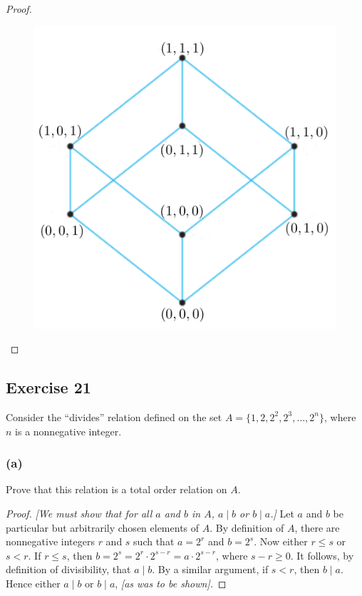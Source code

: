 \documentclass[14pt]{extarticle}
\begin{document}
\begin{proof}
\begin{figure}[ht!]
\centering
\includegraphics[scale=0.4]{../images/8.5.20.png}
\end{figure}
\end{proof}

\subsection{Exercise 21}
Consider the “divides” relation defined on the set \(A = \{1, 2, 2^2, 2^3, \ldots, 2^n\}\), where $n$ is a 
nonnegative integer.

\subsubsection{(a)}
Prove that this relation is a total order relation on $A$.

\begin{proof}
{\it [We must show that for all $a$ and $b$ in $A$, \(a \mid b\) or \(b \mid a\).]} Let $a$ and $b$ be particular 
but arbitrarily chosen elements of $A$. By definition of $A$, there are nonnegative integers $r$ and $s$ such that 
\(a = 2^r\) and \(b = 2^s\). Now either \(r \leq s\) or \(s < r\). If \(r \leq s\), then \(b = 2^s = 2^r \cdot 2^{s-r} 
= a \cdot 2^{s-r}\), where \(s - r \geq 0\). It follows, by definition of divisibility, that \(a \mid b\). By a similar 
argument, if \(s < r\), then \(b \mid a\). Hence either \(a \mid b\) or \(b \mid a\), {\it [as was to be shown].}
\end{proof}
\end{document}
